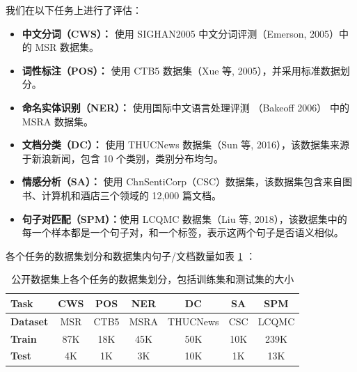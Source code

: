 \documentclass[12pt, a4paper]{ctexart}
\begin{document}
我们在以下任务上进行了评估：
\begin{itemize}
    \item \textbf{中文分词（CWS）：} 使用 SIGHAN2005 中文分词评测（Emerson, 2005）\cite{emerson-2005-second}中的 MSR 数据集。
    \item \textbf{词性标注（POS）：} 使用 CTB5 数据集（Xue 等, 2005）\cite{10.1017/S135132490400364X}，并采用标准数据划分。
    \item \textbf{命名实体识别（NER）：} 使用国际中文语言处理评测 （Bakeoff 2006）\cite{levow-2006-third} 中的 MSRA 数据集。
    \item \textbf{文档分类（DC）：} 使用 THUCNews 数据集（Sun 等, 2016）\cite{sun2016thuctc}，该数据集来源于新浪新闻，包含 10 个类别，类别分布均匀。
    \item \textbf{情感分析（SA）：} 使用 ChnSentiCorp（CSC）数据集\cite{yfwt-wr77-20}，该数据集包含来自图书、计算机和酒店三个领域的 12,000 篇文档。
    \item \textbf{句子对匹配（SPM）：}使用 LCQMC 数据集（Liu 等, 2018）\cite{liu-etal-2018-lcqmc}，该数据集中的每一个样本都是一个句子对，和一个标签，表示这两个句子是否语义相似。
\end{itemize}

各个任务的数据集划分和数据集内句子/文档数量如表 \ref{tab:public_datasets} ：

\begin{table}[H]
    \renewcommand{\arraystretch}{1}
    \centering
    \caption{公开数据集上各个任务的数据集划分，包括训练集和测试集的大小}
    \begin{tabular}{l|cccccc}
        \toprule
        \textbf{Task} & CWS & POS & NER & DC & SA & SPM\\
        \midrule
        \textbf{Dataset} & MSR & CTB5 & MSRA & THUCNews & CSC & LCQMC\\
        \midrule
        \textbf{Train} & 87K & 18K & 45K & 50K & 10K & 239K \\
        \textbf{Test} & 4K & 1K & 3K & 10K & 1K & 13K \\
        \bottomrule
    \end{tabular}
    \label{tab:public_datasets}
\end{table}
\end{document}
